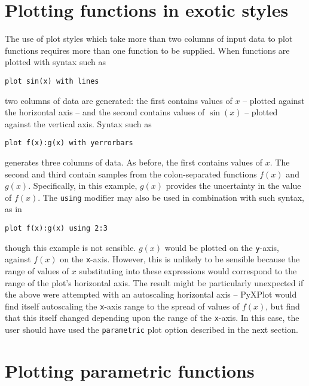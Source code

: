 \section{Plotting functions in exotic styles}

The use of plot styles which take more than two columns of input data to plot
functions requires more than one function to be supplied.  When functions are
plotted with syntax such as

\begin{verbatim}
plot sin(x) with lines
\end{verbatim}

\noindent two columns of data are generated: the first contains values of $x$
-- plotted against the horizontal axis -- and the second contains values of
$\sin(x)$ -- plotted against the vertical axis. Syntax such as

\begin{verbatim}
plot f(x):g(x) with yerrorbars
\end{verbatim}

\noindent generates three columns of data. As before, the first contains values
of $x$. The second and third contain samples from the colon-separated functions
$f(x)$ and $g(x)$. Specifically, in this example, $g(x)$ provides the
uncertainty in the value of $f(x)$.  The {\tt using} modifier may also be used
in combination with such syntax, as in

\begin{verbatim}
plot f(x):g(x) using 2:3
\end{verbatim}

\noindent though this example is not sensible. $g(x)$ would be plotted on the
{\tt y}-axis, against $f(x)$ on the {\tt x}-axis. However, this is unlikely to be
sensible because the range of values of $x$ substituting into these expressions
would correspond to the range of the plot's horizontal axis. The result might
be particularly unexpected if the above were attempted with an autoscaling
horizontal axis -- PyXPlot would find itself autoscaling the {\tt x}-axis range
to the spread of values of $f(x)$, but find that this itself changed depending
upon the range of the {\tt x}-axis. In this case, the user should have used the
{\tt parametric} plot option described in the next section.

\section{Plotting parametric functions}
\label{sec:parametric_plotting}


